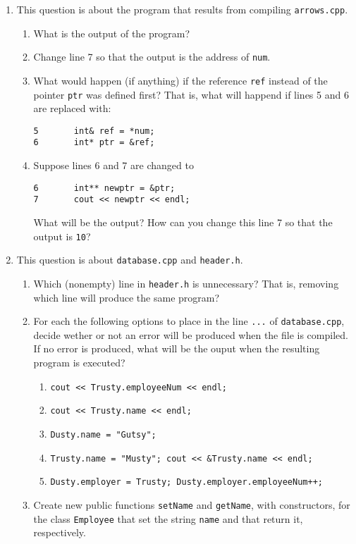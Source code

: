 \documentclass[a4paper,12pt]{article}
\begin{document}
\begin{enumerate}
\item This question is about the program that results from compiling \texttt{arrows.cpp}.
\begin{enumerate}
\item What is the output of the program?
\item Change line 7 so that the output is the address of \texttt{num}.
\item What would happen (if anything) if the reference \texttt{ref} instead of the pointer \texttt{ptr} was defined first? That is, what will happend if lines 5 and 6 are replaced with:
\begin{verbatim}
5       int& ref = *num;
6       int* ptr = &ref;
\end{verbatim}
\item Suppose lines 6 and 7 are changed to 
\begin{verbatim}
6       int** newptr = &ptr;
7       cout << newptr << endl;
\end{verbatim}
What will be the output? How can you change this line 7 so that the output is \texttt{10}?
\end{enumerate}

\vfill

\item This question is about \texttt{database.cpp} and \texttt{header.h}.
\begin{enumerate}
\item Which (nonempty) line in \texttt{header.h} is unnecessary? That is, removing which line will produce the same program?
\item For each the following options to place in the line \texttt{...} of \texttt{database.cpp}, decide wether or not an error will be produced when the file is compiled. If no error is produced, what will be the ouput when the resulting program is executed?
\begin{enumerate}
\item \texttt{cout << Trusty.employeeNum << endl;}
\item \texttt{cout << Trusty.name << endl;}
\item \texttt{Dusty.name = "Gutsy";}
\item \texttt{Trusty.name = "Musty"; cout << \&Trusty.name << endl;}
\item \texttt{Dusty.employer = Trusty; Dusty.employer.employeeNum++;}
\end{enumerate}
\item Create new public functions \texttt{setName} and \texttt{getName}, with constructors, for the class \texttt{Employee} that set the string \texttt{name} and that return it, respectively.
\end{enumerate}
\end{enumerate}
\end{document}
